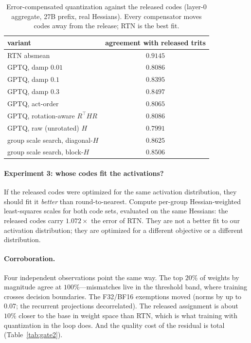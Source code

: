 \begin{table}[t]
\caption{Error-compensated quantization against the released codes (layer-0
aggregate, 27B prefix, real Hessians). Every compensator moves codes away from
the release; RTN is the best fit.}
\label{tab:gptq}
\begin{center}
\begin{tabular}{lc}
\toprule
variant & agreement with released trits \\
\midrule
RTN absmean & $\mathbf{0.9145}$ \\
GPTQ, damp $0.01$ & $0.8086$ \\
GPTQ, damp $0.1$ & $0.8395$ \\
GPTQ, damp $0.3$ & $0.8497$ \\
GPTQ, act-order & $0.8065$ \\
GPTQ, rotation-aware $R^{\top} H R$ & $0.8086$ \\
GPTQ, raw (unrotated) $H$ & $0.7991$ \\
group scale search, diagonal-$H$ & $0.8625$ \\
group scale search, block-$H$ & $0.8506$ \\
\bottomrule
\end{tabular}
\end{center}
\end{table}

\paragraph{Experiment 3: whose codes fit the activations?}
If the released codes were optimized for the same activation distribution, they
should fit it \emph{better} than round-to-nearest. Compute per-group
Hessian-weighted least-squares scales for both code sets, evaluated on the same
Hessians: the released codes carry $1.072\times$ the error of RTN. They are not
a better fit to our activation distribution; they are optimized for a different
objective or a different distribution.

\paragraph{Corroboration.}
Four independent observations point the same way. The top $20\%$ of weights by
magnitude agree at $100\%$---mismatches live in the threshold band, where
training crosses decision boundaries. The F32/BF16 exemptions moved (norms by
up to $0.07$; the recurrent projections decorrelated). The released assignment
is about $10\%$ closer to the base in weight space than RTN, which is what
training with quantization in the loop does. And the quality cost of the
residual is total (Table~\ref{tab:gate2}).

